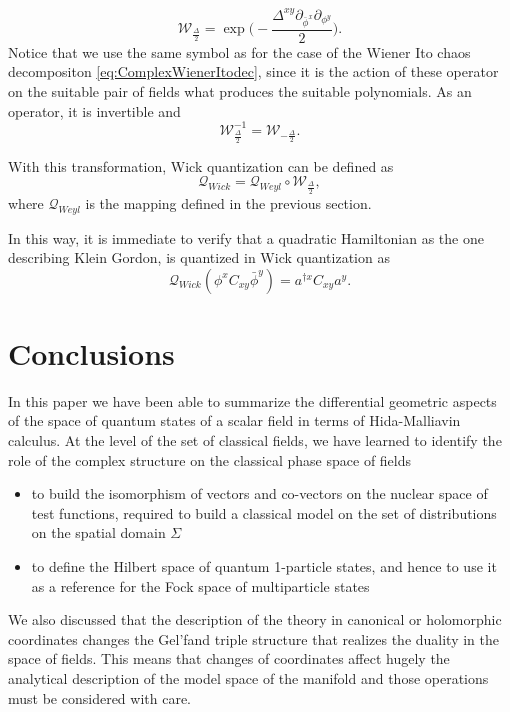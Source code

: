 \documentclass[12pt]{article}%
\begin{document}
\begin{equation}
    \mathcal{W}_{\frac{\Delta}{2}}=\exp\Big(-\frac{\Delta^{xy}\partial_{\bar\phi^x}\partial_{\phi^y}}{2}\Big). 
\label{eq:wick_iso} 
\end{equation}
Notice that we use the same symbol as for the case of the Wiener Ito chaos decompositon \eqref{eq:ComplexWienerItodec}, since it is the action of these operator on the suitable pair of fields what produces the suitable polynomials.  As an operator, it is invertible and
\begin{equation}
 \label{eq:wick-inverse}
 \mathcal{W}_{\frac{\Delta}{2}}^{-1}=\mathcal{W}_{-\frac{\Delta}2}.
\end{equation}

With this transformation, Wick quantization can be defined as
$$\mathcal{Q}_{Wick}= \mathcal{Q}_{Weyl}\circ\mathcal{W}_{\frac{\Delta}2},$$
where $\mathcal{Q}_{Weyl}$ is the mapping defined in the previous section.

In this way, it is immediate to verify that a quadratic Hamiltonian  as the one describing Klein Gordon, is quantized in Wick quantization as 
$$\mathcal{Q}_{Wick}(\phi^xC_{xy}\bar\phi^y)= a^{\dagger x}C_{xy}a^{y}.$$ 


\section{Conclusions}
\label{sec:conclusions}
In this paper we have been able to summarize the differential geometric aspects of the space of quantum states of a scalar field in terms of Hida-Malliavin calculus. At the level of the set of classical fields, we have learned to identify the role of the complex structure on the classical phase space of fields
\begin{itemize}
    \item to build the isomorphism of vectors and co-vectors on the nuclear space of test functions, required to build a classical model on the set of distributions on the spatial domain $\Sigma$ 
    \item to define the Hilbert space of quantum 1-particle states, and hence to use it as a reference for the Fock space of multiparticle states
\end{itemize}
We also discussed that the description of the theory in canonical or holomorphic coordinates changes the  Gel'fand triple structure that realizes the duality in the space of fields. This means that changes of coordinates affect hugely the analytical description of the model space of the manifold and those operations must be considered with care.  
\end{document}
